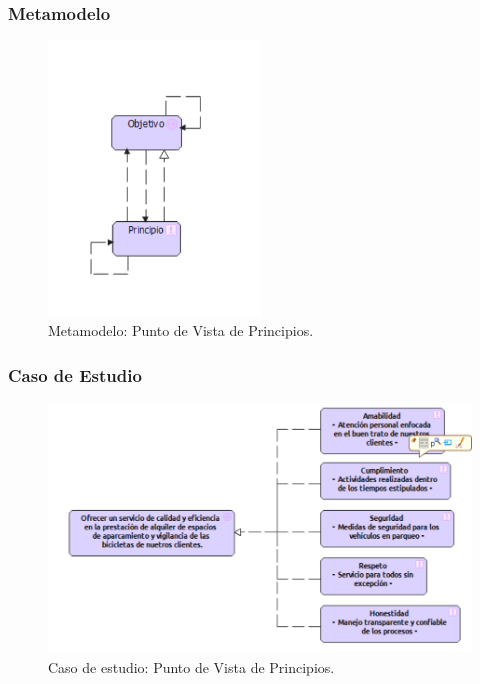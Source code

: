 \subsubsection{Metamodelo}
\begin{figure}[H]
	\centering
	\includegraphics[width=0.5\textwidth]{imagenes/Metamodelos/Motivacion/meta_Principios.pdf}
	\caption{Metamodelo: Punto de Vista de Principios.}
	\label{fig:gap_analysis}
\end{figure}

\subsubsection{Caso de Estudio}


\begin{figure}[H]
	\centering
	\includegraphics[width=1.0\textwidth]{imagenes/Caso_Estudio/Motivacion/Principios.PDF}
	\caption{Caso de estudio: Punto de Vista de Principios.}
	\label{fig:gap_analysis}
\end{figure}


